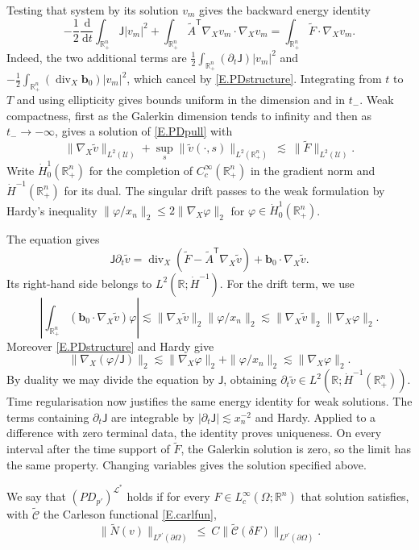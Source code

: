 \documentclass[12pt,leqno]{amsart}
\numberwithin{equation}{section}
\DeclareMathOperator{\divg}{div}
\newcommand{\R}{\mathbb R}
\newcommand{\wt}{\widetilde}
\newcommand{\om}{\Omega}
\newcommand{\pom}{\partial\Omega}
\newcommand{\pd}{\partial}
\newcommand{\LL}{\mathcal L}
\newcommand{\Uc}{\mathcal U}
\newcommand{\Nt}{\widetilde N}
\renewcommand{\d}{\,\mathrm d}
\theoremstyle{plain}
\theoremstyle{remark}
\begin{document}
Testing that system by its solution $v_m$ gives the backward energy identity
\begin{equation}\label{E.PDenergy}
 -\frac12\frac{\d}{\d t}\int_{\R^n_+}\mathsf J |v_m|^2
 +\int_{\R^n_+}\widetilde A^{\mathsf T}\nabla_Xv_m\cdot\nabla_Xv_m
 =\int_{\R^n_+}\widetilde F\cdot\nabla_Xv_m.
\end{equation}
Indeed, the two additional terms are
$\frac12\int_{\R^n_+}(\pd_t\mathsf J)|v_m|^2$ and
$-\frac12\int_{\R^n_+}(\divg_X\mathbf b_0)|v_m|^2$, which cancel by
\eqref{E.PDstructure}. Integrating from $t$ to $T$ and using ellipticity
gives bounds uniform in the dimension and in $t_-$. Weak compactness, first as
the Galerkin dimension tends to infinity and then as $t_-\to-\infty$, gives a solution
of \eqref{E.PDpull} with
$$\|\nabla_X\widetilde v\|_{L^2(\Uc)}
 +\sup_s\|\widetilde v(\cdot,s)\|_{L^2(\R^n_+)}
 \ \lesssim\ \|\widetilde F\|_{L^2(\Uc)}.$$
Write $\dot H^1_0(\R^n_+)$ for the completion of $C_c^\infty(\R^n_+)$
in the gradient norm and $\dot H^{-1}(\R^n_+)$ for its dual.
The singular drift passes to the weak formulation by Hardy's inequality
$\|\varphi/x_n\|_2\le2\|\nabla_X\varphi\|_2$ for
$\varphi\in\dot H^1_0(\R^n_+)$.

The equation gives
\[
 \mathsf J\pd_t\widetilde v
 =\divg_X(\widetilde F-\widetilde A^{\mathsf T}\nabla_X\widetilde v)
   +\mathbf b_0\cdot\nabla_X\widetilde v.
\]
Its right-hand side belongs to $L^2(\R;\dot H^{-1})$. For the drift term,
we use
\[
 \left|\int_{\R^n_+}(\mathbf b_0\cdot\nabla_X\widetilde v)\varphi\right|
 \lesssim\|\nabla_X\widetilde v\|_2\|\varphi/x_n\|_2
 \lesssim\|\nabla_X\widetilde v\|_2\|\nabla_X\varphi\|_2.
\]
Moreover \eqref{E.PDstructure} and Hardy give
\[
 \|\nabla_X(\varphi/\mathsf J)\|_2
 \lesssim\|\nabla_X\varphi\|_2+\|\varphi/x_n\|_2
 \lesssim\|\nabla_X\varphi\|_2.
\]
By duality we may divide the equation by $\mathsf J$, obtaining
$\pd_t\widetilde v\in L^2(\R;\dot H^{-1}(\R^n_+))$.
Time regularisation now justifies the same energy identity for weak
solutions. The terms containing $\pd_t\mathsf J$ are integrable by
$|\pd_t\mathsf J|\lesssim x_n^{-2}$ and Hardy. Applied to a difference
with zero terminal data, the identity proves uniqueness. On every interval
after the time support of $\widetilde F$, the Galerkin solution is zero, so
the limit has the same property.
Changing variables gives the solution specified above.\medskip

\noindent We say that $(PD_{p'})^{\LL^*}$ holds if for every
$F\in L^\infty_c(\om;\R^n)$ that solution satisfies, with
$\wt{\mathcal C}$ the Carleson functional \eqref{E.carlfun},
$$\big\|\Nt(v)\big\|_{L^{p'}(\pom)}\ \le\
  C\big\|\wt{\mathcal C}(\delta F)\big\|_{L^{p'}(\pom)} .$$
\end{document}

